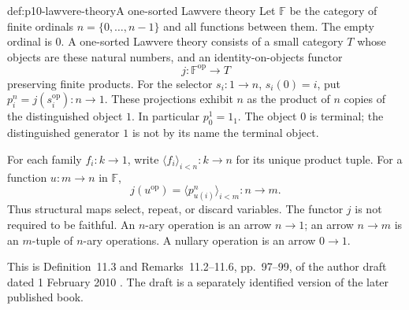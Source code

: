 \begin{hbdefinition}{def:p10-lawvere-theory}{A one-sorted Lawvere theory}
Let \(\mathbb F\) be the category of finite ordinals
\(n=\{0,\ldots,n-1\}\) and all functions between them.
The empty ordinal is \(0\).
A one-sorted Lawvere theory consists of a small category \(T\)
whose objects are these natural numbers, and an identity-on-objects
functor
\[
                         j:\mathbb F^{\mathrm{op}}\longrightarrow T
\]
preserving finite products.
For the selector \(s_i:1\to n\), \(s_i(0)=i\), put
\(p_i^n=j(s_i^{\mathrm{op}}):n\to1\).
These projections exhibit \(n\) as the product of \(n\) copies
of the distinguished object \(1\).
In particular \(p_0^1=1_1\).
The object \(0\) is terminal; the distinguished generator \(1\)
is not by its name the terminal object.

For each family \(f_i:k\to1\), write
\(\langle f_i\rangle_{i<n}:k\to n\) for its unique product tuple.
For a function \(u:m\to n\) in \(\mathbb F\),
\[
                  j(u^{\mathrm{op}})
                     =\langle p_{u(i)}^n\rangle_{i<m}:n\to m.
\]
Thus structural maps select, repeat, or discard variables.
The functor \(j\) is not required to be faithful.
An \(n\)-ary operation is an arrow \(n\to1\); an arrow \(n\to m\)
is an \(m\)-tuple of \(n\)-ary operations.
A nullary operation is an arrow \(0\to1\).
\end{hbdefinition}

This is Definition~11.3 and Remarks~11.2--11.6, pp.~97--99,
of the author draft dated 1 February 2010
\cite{AdamekRosickyVitale2010Draft}.  The draft is a separately
identified version of the later published book.

